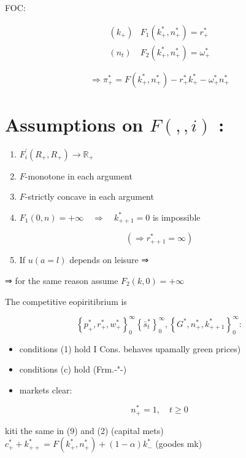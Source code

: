 \documentclass[10pt]{article}
\begin{document}
FOC:

\[
\begin{array}{ll}
\left(k_{+}\right) & F_{1}\left(k_{+}^{*}, n_{+}^{*}\right)=r_{+}^{*}  \tag{2}\\
\left(n_{t}\right) & F_{2}\left(k_{+}^{*}, n_{+}^{*}\right)=\omega_{+}^{*}
\end{array}
\]

$$
\Rightarrow \pi_{+}^{*}=F\left(k_{+}^{*}, n_{+}^{*}\right)-r_{+}^{*} k_{+}^{*}-\omega_{+}^{*} n_{+}^{*}
$$

\section*{Assumptions on $F(,, i)$ :}
\begin{enumerate}
  \item $F_{i}^{\prime}\left(R_{+}, R_{+}\right) \rightarrow \mathbb{R}_{+}$
  \item $F$-monotone in each argument
  \item $F$-strictly concave in each argument
  \item $F_{1}(0, n)=+\infty \quad \Rightarrow \quad k_{++1}^{*}=0$ is impossible
\end{enumerate}

$$
\left(\Rightarrow r_{++1}^{*}=\infty\right)
$$

\begin{enumerate}
  \setcounter{enumi}{4}
  \item If $u(a=l)$ depends on leisure ⇒
\end{enumerate}

⇒ for the same reason assume $F_{2}(k, 0)=+\infty$

The competitive eopiritibrium is

$$
\left\{p_{+}^{*}, r_{+}^{*}, w_{+}^{*}\right\}_{0}^{\infty}\left\{\bar{s}_{t}^{*}\right\}_{0}^{\infty},\left\{G^{*}, n_{+}^{*}, k_{++1}^{*}\right\}_{0}^{\infty}:
$$

\begin{itemize}
  \item conditions (1) hold I Cons. behaves upamally green prices)
  \item conditions (c) hold (Frm.-"-)
  \item markets clear:
\end{itemize}

$$
n_{+}^{*}=1, \quad t \geq 0
$$

kiti the same in (9) and (2) (capital mets) $c_{+}^{*}+k_{++}^{*}=F\left(k_{+}^{*}, n_{+}^{*}\right)+(1-\alpha) k_{-}^{*}$ (goodes mk)
\end{document}
